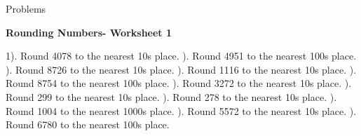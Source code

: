\documentclass{article}%
\begin{document}
%
\huge%
\vspace*{\fill}%
\begin{center}%
Problems%
\end{center}%
\vspace*{\fill}%
\pagebreak%
\normalsize%
\large%
\begin{center}%
\textbf{Rounding Numbers- Worksheet 1}%
\newline%
\end{center} \normalsize%
1). Round 4078 to the nearest 10s place.%
\newline%
\newline%
). Round 4951 to the nearest 100s place.%
\newline%
\newline%
). Round 8726 to the nearest 10s place.%
\newline%
\newline%
). Round 1116 to the nearest 10s place.%
\newline%
\newline%
). Round 8754 to the nearest 100s place.%
\newline%
\newline%
). Round 3272 to the nearest 10s place.%
\newline%
\newline%
). Round 299 to the nearest 10s place.%
\newline%
\newline%
). Round 278 to the nearest 10s place.%
\newline%
\newline%
). Round 1004 to the nearest 1000s place.%
\newline%
\newline%
). Round 5572 to the nearest 10s place.%
\newline%
\newline%
). Round 6780 to the nearest 100s place.%
\newline%
\newline%
\newline%
\end{document}
